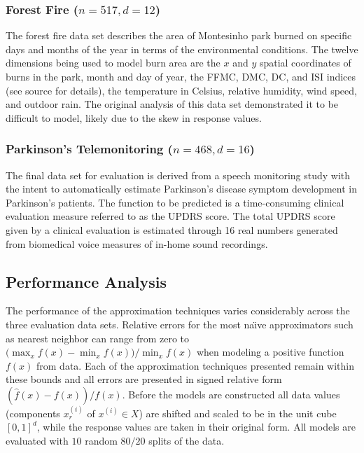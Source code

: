 \documentclass[sigconf]{acmart}
\begin{document}
\subsubsection{Forest Fire ($n = 517, d = 12$)}
The forest fire data set \cite{cortez2007data} describes the area of Montesinho park burned on specific days and months of the year in terms of the environmental conditions. The twelve dimensions being used to model burn area are the $x$ and $y$ spatial coordinates of burns in the park, month and day of year, the FFMC, DMC, DC, and ISI indices (see source for details), the temperature in Celsius, relative humidity, wind speed, and outdoor rain. The original analysis of this data set demonstrated it to be difficult to model, likely due to the skew in response values.

\subsubsection{Parkinson's Telemonitoring ($n = 468, d = 16$)}
The final data set for evaluation \cite{tsanas2010accurate} is derived from a speech monitoring study with the intent to automatically estimate Parkinson's disease symptom development in Parkinson's patients. The function to be predicted is a time-consuming clinical evaluation measure referred to as the UPDRS score. The total UPDRS score given by a clinical evaluation is estimated through 16 real numbers generated from biomedical voice measures of in-home sound recordings.

\subsection{Performance Analysis}
\label{sec_performance_analysis}

The performance of the approximation techniques varies considerably across the three evaluation data sets. Relative errors for the most na\"{\i}ve approximators such as nearest neighbor can range from zero to $\displaystyle \big(\max_x f(x) - \min_x f(x)\big) / \min_x f(x)$ when modeling a positive function $f(x)$ from data. Each of the approximation techniques presented remain within these bounds and all errors are presented in signed relative form $(\hat f(x) - f(x)) / f(x)$. Before the models are constructed all data values (components $x^{(i)}_r$ of $x^{(i)} \in X$) are shifted and scaled to be in the unit cube $[0,1]^d$, while the response values are taken in their original form. All models are evaluated with $10$ random $80/20$ splits of the data.
\end{document}
